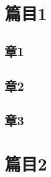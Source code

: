 \documentclass[./main]{subfiles}
\begin{document}
\pagestyle{mystyle}

\chapter{篇目1}

\newpage

\section{章1}

\sampletext

\section{章2}

\sampletext

\sampletext

\sampletext

\clearpage

\section{章3}

\sampletext

\storyend[第一篇完]

\theendnotes

\chapter{篇目2}

\sampletext

\sampletext

\storyend

\theendnotes
\end{document}
